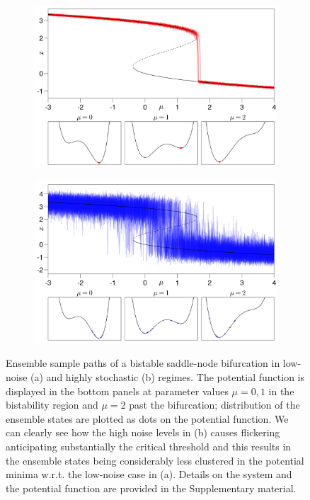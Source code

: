 \documentclass[../main.tex]{subfiles}
\begin{document}
\begin{figure}[H]
   \begin{subfigure}[b]{0.475\textwidth}
        \centering 
        \includegraphics[keepaspectratio, width = \linewidth]{../figures/fig1.3.1.png}
        \caption{}
        \label{fig1.3.1}
   \end{subfigure}
   \hfill
   \begin{subfigure}[b]{0.475\textwidth}
        \centering 
        \includegraphics[keepaspectratio, width = \linewidth]{../figures/fig1.3.2.png}
        \caption{}
        \label{fig1.3.2}
   \end{subfigure}
    \caption{Ensemble sample paths of a bistable saddle-node bifurcation in low-noise (a) and highly stochastic (b) regimes. 
    The potential function is displayed in the bottom panels at parameter values $\mu=0,1$ in the bistability region and $\mu=2$ past the bifurcation; distribution of the ensemble states are plotted as dots on the potential function. 
We can clearly see how the high noise levels in (b) causes flickering anticipating substantially the critical threshold and this results in the ensemble states being considerably less clustered in the potential minima w.r.t. the low-noise case in (a). Details on the system and the potential function are provided in the Supplementary material.}
    \label{fig1.3}
\end{figure}
\end{document}

